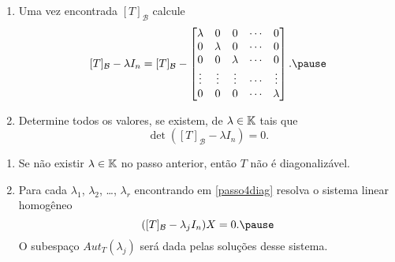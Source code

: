 \documentclass{beamer}
\begin{document}
    \begin{frame}
        \begin{enumerate}[label={\arabic*})]
            \conti
            \item Uma vez encontrada $[T]_\mathcal{B}$ calcule\pause
            \[
                [T]_\mathcal{B} - \lambda I_n = [T]_\mathcal{B} - \begin{bmatrix}\lambda & 0 & 0 & \cdots & 0\\0 & \lambda & 0 &
                \cdots & 0\\0 & 0 & \lambda & \cdots & 0\\\vdots & \vdots & \vdots & \cdots & \vdots\\0 & 0 & 0 & \cdots &
            \lambda\end{bmatrix}.\pause
            \]

            \item\label{passo4diag} Determine todos os valores, \pause se existem, de $\lambda \in \mathbb{K}$ \pause tais que\pause
            \[
                \det([T]_\mathcal{B} - \lambda I_n) = 0.
            \]
            \seti
        \end{enumerate}
    \end{frame}

    \begin{frame}
        \begin{enumerate}[label={\arabic*})]
            \conti
            \item Se não existir $\lambda \in \mathbb{K}$ \pause no passo anterior, \pause então $T$ não é diagonalizável.\pause

            \vspace*{1cm}

            \item Para cada $\lambda_1$, \pause $\lambda_2$, \pause \dots, $\lambda_r$ \pause encontrando em \ref{passo4diag} \pause
                resolva o sistema linear homogêneo\pause
            \[
                ([T]_\mathcal{B} - \lambda_jI_n)X = 0.\pause
            \]
            O subespaço $Aut_T(\lambda_j)$ \pause será dada pelas soluções desse sistema.
            \seti
        \end{enumerate}
    \end{frame}
\end{document}
